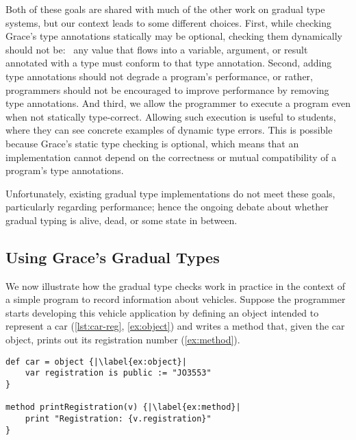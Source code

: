 Both of these goals are shared with
much of the other work on gradual type systems,
but our context leads to some different choices.
First,
while checking Grace's type annotations statically may be optional,
checking them dynamically should not be:%
~any value that flows into a variable, argument, or result
annotated with a type must conform to that type annotation.
Second, 
adding type annotations should not degrade a program's performance,
or rather, programmers should not be encouraged to
improve performance by removing type annotations.
And third, 
we allow the programmer to execute a program even when not statically type-correct.
Allowing such execution is useful to students,
where they can see concrete examples of dynamic type errors.
This is possible because Grace's static type checking is optional,
which means that an
implementation cannot depend on the correctness or mutual
compatibility of a program's type
annotations.


Unfortunately, existing gradual type
implementations do not meet these goals, particularly regarding
performance; hence the ongoing debate about whether gradual typing is
alive, dead, or some state
in between\citep{Takikawa2016,Vitousek2017,Muehlboeck2017,Bauman2017,Richards2017,Greenman2018,Greenman2019jfp}.


\subsection{Using Grace's Gradual Types}

We now illustrate how the gradual type checks work in practice
in the context of a simple program to record information about vehicles.
Suppose the programmer starts developing this vehicle
application by defining an object intended to represent a car
(\cref{lst:car-reg}, \cref{ex:object}) and writes a method that, given
the car object, prints out its registration number (\cref{ex:method}).
%

\begin{lstlisting}[caption={The start of a simple Grace program for tracking vehicle information.},%
  float=h,label=lst:car-reg,escapechar=|,columns=flexible]
def car = object {|\label{ex:object}|
    var registration is public := "JO3553"
}

method printRegistration(v) {|\label{ex:method}|
    print "Registration: {v.registration}"
}
\end{lstlisting}



